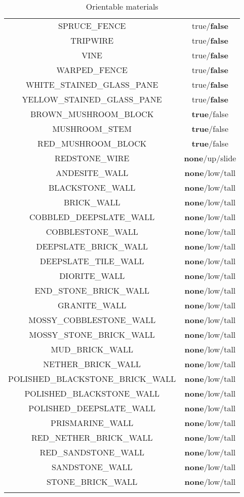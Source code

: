 \begin{longtable}{ |c|c| }
	SPRUCE\_FENCE & true/\textbf{false} \\
	TRIPWIRE & true/\textbf{false} \\
	VINE & true/\textbf{false} \\
	WARPED\_FENCE & true/\textbf{false} \\
	WHITE\_STAINED\_GLASS\_PANE & true/\textbf{false} \\
	YELLOW\_STAINED\_GLASS\_PANE & true/\textbf{false} \\
	\hline
	BROWN\_MUSHROOM\_BLOCK & \textbf{true}/false \\
	MUSHROOM\_STEM & \textbf{true}/false \\
	RED\_MUSHROOM\_BLOCK & \textbf{true}/false \\
	\hline
	REDSTONE\_WIRE & \textbf{none}/up/slide \\
	\hline
	ANDESITE\_WALL & \textbf{none}/low/tall \\
	BLACKSTONE\_WALL & \textbf{none}/low/tall \\
	BRICK\_WALL & \textbf{none}/low/tall \\
	COBBLED\_DEEPSLATE\_WALL & \textbf{none}/low/tall \\
	COBBLESTONE\_WALL & \textbf{none}/low/tall \\
	DEEPSLATE\_BRICK\_WALL & \textbf{none}/low/tall \\
	DEEPSLATE\_TILE\_WALL & \textbf{none}/low/tall \\
	DIORITE\_WALL & \textbf{none}/low/tall \\
	END\_STONE\_BRICK\_WALL & \textbf{none}/low/tall \\
	GRANITE\_WALL & \textbf{none}/low/tall \\
	MOSSY\_COBBLESTONE\_WALL & \textbf{none}/low/tall \\
	MOSSY\_STONE\_BRICK\_WALL & \textbf{none}/low/tall \\
	MUD\_BRICK\_WALL & \textbf{none}/low/tall \\
	NETHER\_BRICK\_WALL & \textbf{none}/low/tall \\
	POLISHED\_BLACKSTONE\_BRICK\_WALL & \textbf{none}/low/tall \\
	POLISHED\_BLACKSTONE\_WALL & \textbf{none}/low/tall \\
	POLISHED\_DEEPSLATE\_WALL & \textbf{none}/low/tall \\
	PRISMARINE\_WALL & \textbf{none}/low/tall \\
	RED\_NETHER\_BRICK\_WALL & \textbf{none}/low/tall \\
	RED\_SANDSTONE\_WALL & \textbf{none}/low/tall \\
	SANDSTONE\_WALL & \textbf{none}/low/tall \\
	STONE\_BRICK\_WALL & \textbf{none}/low/tall \\
	\hline
	\caption{Orientable materials}
\end{longtable}

